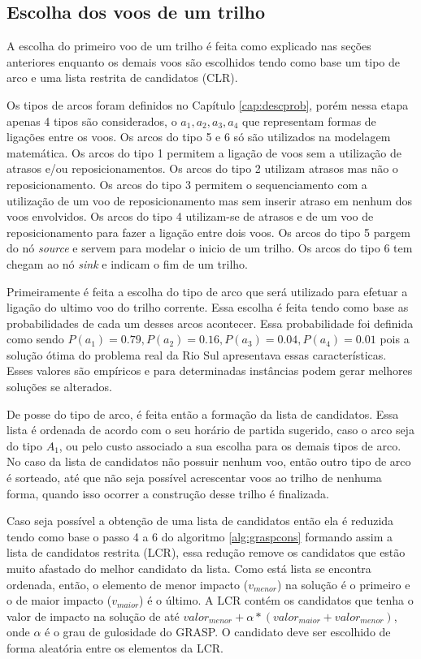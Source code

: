  
\subsection{Escolha dos voos de um trilho}

A escolha do primeiro voo de um trilho é feita como explicado nas seções
anteriores enquanto os demais voos são escolhidos tendo como base um tipo de
arco e uma lista restrita de candidatos (CLR).
 
Os tipos de arcos foram definidos no Capítulo \ref{cap:descprob}, porém nessa
etapa apenas 4 tipos são considerados, o   $a_{1},a_{2},a_{3},a_{4}$ que
representam formas de ligações entre os voos. Os arcos do tipo 5 e 6 só são
utilizados na modelagem matemática. Os arcos do tipo 1 permitem a
ligação de voos sem a utilização de atrasos e/ou reposicionamentos. Os arcos do
tipo 2 utilizam atrasos mas não o reposicionamento. Os arcos do tipo 3 permitem
o sequenciamento com a utilização de um voo de reposicionamento mas sem inserir
atraso em nenhum dos voos envolvidos. Os arcos do tipo 4 utilizam-se de atrasos
e de um voo de reposicionamento para fazer a ligação entre dois voos. Os arcos
do tipo 5 pargem do nó \textit{source} e servem para modelar o inicio de um
trilho. Os arcos do tipo 6 tem chegam ao nó \textit{sink} e indicam o fim de um
trilho.

Primeiramente é feita a escolha do tipo de arco que será utilizado para efetuar
a ligação do ultimo voo do trilho corrente. Essa escolha é feita tendo
como base as probabilidades de cada um desses arcos acontecer. Essa
probabilidade foi definida como sendo
$P(a_{1})=0.79,P(a_{2})=0.16,P(a_{3})=0.04,P(a_{4})=0.01$ pois a solução ótima
do problema real da Rio Sul apresentava essas características. Esses valores
são empíricos e para determinadas instâncias podem gerar melhores soluções se
alterados.

De posse do tipo de arco, é feita então a formação da lista de candidatos. Essa
lista é ordenada de acordo com o seu horário de partida sugerido, caso o arco
seja do tipo $A_{1}$, ou pelo custo associado a sua escolha para os demais
tipos de arco. No caso da lista de candidatos não possuir nenhum voo, então
outro tipo de arco é sorteado, até que não seja possível acrescentar voos ao
trilho de nenhuma forma, quando isso ocorrer a construção
desse trilho é finalizada.
 
Caso seja possível a obtenção de uma lista de candidatos então ela é reduzida
tendo como base o passo 4 a 6 do algoritmo \ref{alg:graspcons} formando assim a
lista de candidatos restrita (LCR), essa redução remove os candidatos que estão
muito afastado do melhor candidato da lista. Como está lista se encontra
ordenada, então, o elemento de menor impacto ($v_{menor}$) na solução é o
primeiro e o de maior impacto ($v_{maior}$) é o último. A LCR contém os
candidatos que tenha o valor de impacto na solução de até $valor_{menor} +
\alpha*(valor_{maior} + valor_{menor})$, onde $\alpha$ é o grau de
gulosidade do GRASP. O candidato deve ser escolhido de forma aleatória entre os
elementos da LCR.

